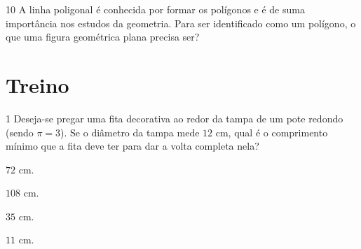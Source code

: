 {{{{


\num{10} A linha poligonal é conhecida por formar os polígonos e é de suma
importância nos estudos da geometria. Para ser identificado como um
polígono, o que uma figura geométrica plana precisa ser?


\section*{Treino}

\num{1}  Deseja-se pregar uma fita decorativa ao redor da tampa de um pote
redondo (sendo $\pi = 3$). Se o diâmetro da tampa mede $12$ cm, qual é o comprimento mínimo
que a fita deve ter para dar a volta completa nela?

\begin{escolha}
\item $72$ cm.
\item $108$ cm.
\item $35$ cm.
\item $11$ cm.
\end{escolha}



}}}}
